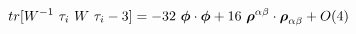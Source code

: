 \begin{equation}
tr[W^{-1}~\tau_i~W~\tau_i -3]= -32 ~\mbox{\boldmath$\phi$} \cdot \mbox{\boldmath$\phi$} +16~\mbox{\boldmath$\rho$}^{\alpha\beta} \cdot  \mbox{\boldmath$\rho$}_{\alpha\beta} + O(4)
\end{equation}

